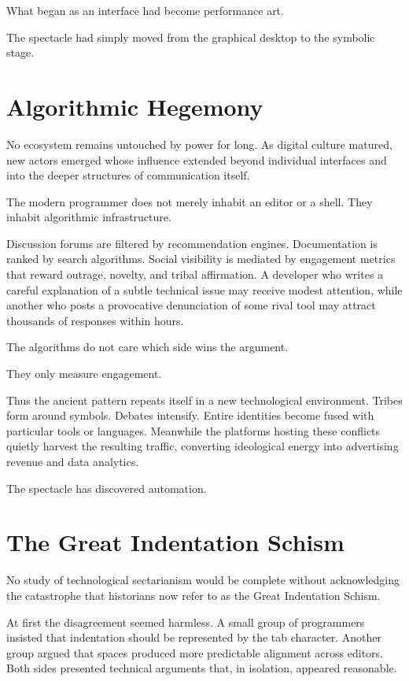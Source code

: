 \documentclass[11pt]{article}
\theoremstyle{definition}
\begin{document}
What began as an interface had become performance art.

The spectacle had simply moved from the graphical desktop to the symbolic
stage.

\section{Algorithmic Hegemony}

No ecosystem remains untouched by power for long. As digital culture
matured, new actors emerged whose influence extended beyond individual
interfaces and into the deeper structures of communication itself.

The modern programmer does not merely inhabit an editor or a shell. They
inhabit algorithmic infrastructure.

Discussion forums are filtered by recommendation engines. Documentation
is ranked by search algorithms. Social visibility is mediated by
engagement metrics that reward outrage, novelty, and tribal affirmation.
A developer who writes a careful explanation of a subtle technical issue
may receive modest attention, while another who posts a provocative
denunciation of some rival tool may attract thousands of responses
within hours.

The algorithms do not care which side wins the argument.

They only measure engagement.

Thus the ancient pattern repeats itself in a new technological
environment. Tribes form around symbols. Debates intensify. Entire
identities become fused with particular tools or languages. Meanwhile
the platforms hosting these conflicts quietly harvest the resulting
traffic, converting ideological energy into advertising revenue and
data analytics.

The spectacle has discovered automation.

\section{The Great Indentation Schism}

No study of technological sectarianism would be complete without
acknowledging the catastrophe that historians now refer to as the Great
Indentation Schism.

At first the disagreement seemed harmless. A small group of programmers
insisted that indentation should be represented by the tab character.
Another group argued that spaces produced more predictable alignment
across editors. Both sides presented technical arguments that, in
isolation, appeared reasonable.
\end{document}
